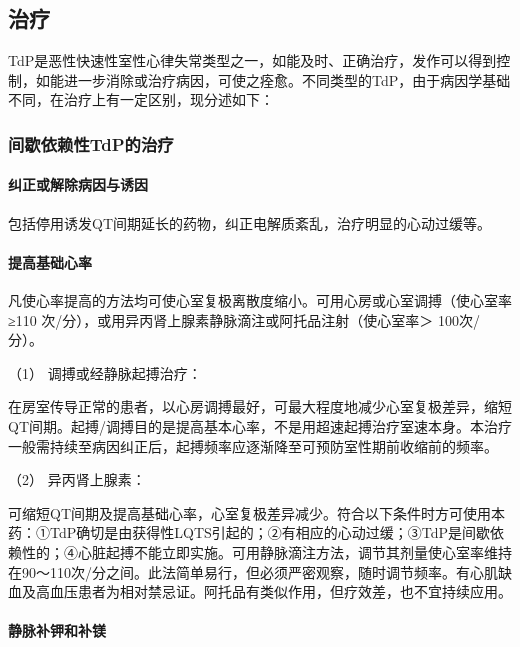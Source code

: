 \subsection{治疗}

TdP是恶性快速性室性心律失常类型之一，如能及时、正确治疗，发作可以得到控制，如能进一步消除或治疗病因，可使之痊愈。不同类型的TdP，由于病因学基础不同，在治疗上有一定区别，现分述如下：

\subsubsection{间歇依赖性TdP的治疗}

\paragraph{纠正或解除病因与诱因}

包括停用诱发QT间期延长的药物，纠正电解质紊乱，治疗明显的心动过缓等。

\paragraph{提高基础心率}

凡使心率提高的方法均可使心室复极离散度缩小。可用心房或心室调搏（使心室率≥110
次/分），或用异丙肾上腺素静脉滴注或阿托品注射（使心室率＞ 100次/分）。

\hypertarget{text00293.htmlux5cux23CHP10-2-6-1-3-1-2-1}{}
（1） 调搏或经静脉起搏治疗：

在房室传导正常的患者，以心房调搏最好，可最大程度地减少心室复极差异，缩短QT间期。起搏/调搏目的是提高基本心率，不是用超速起搏治疗室速本身。本治疗一般需持续至病因纠正后，起搏频率应逐渐降至可预防室性期前收缩前的频率。

\hypertarget{text00293.htmlux5cux23CHP10-2-6-1-3-1-2-2}{}
（2） 异丙肾上腺素：

可缩短QT间期及提高基础心率，心室复极差异减少。符合以下条件时方可使用本药：①TdP确切是由获得性LQTS引起的；②有相应的心动过缓；③TdP是间歇依赖性的；④心脏起搏不能立即实施。可用静脉滴注方法，调节其剂量使心室率维持在90～110次/分之间。此法简单易行，但必须严密观察，随时调节频率。有心肌缺血及高血压患者为相对禁忌证。阿托品有类似作用，但疗效差，也不宜持续应用。

\paragraph{静脉补钾和补镁}

